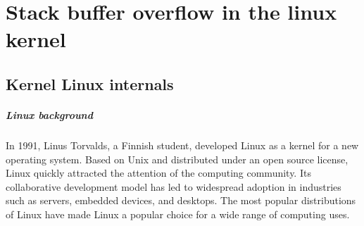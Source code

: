 \chapter{Stack buffer overflow in the linux kernel}
    \section{Kernel Linux internals}
    \paragraph{Linux background}
    In 1991, Linus Torvalds, a Finnish student, developed Linux as a kernel for a new operating system. Based on Unix and distributed under an open source license, Linux quickly attracted the attention of the computing community. \newline
    Its collaborative development model has led to widespread adoption in industries such as servers, embedded devices, and desktops.\newline
    The most popular distributions of Linux have made Linux a popular choice for a wide range of computing uses.\newline
